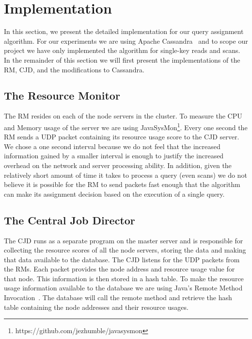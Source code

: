 \section{Implementation}
\label{sec:implementation}
In this section, we present the detailed implementation for our query assignment algorithm. For our experiments we are using Apache Cassandra~\cite{ Lakshman:2010:CDS:1773912.1773922} and to scope our project we have only implemented the algorithm for single-key reads and scans. In the remainder of this section we will first present the implementations of the RM, CJD, and the modifications to Cassandra.

\subsection{The Resource Monitor}
The RM resides on each of the node servers in the cluster. To measure the CPU and Memory usage of the server we are using JavaSysMon\footnote{https://github.com/jezhumble/javasysmon}. Every one second the RM sends a UDP packet containing its resource usage score to the CJD server. We chose a one second interval because we do not feel that the increased information gained by a smaller interval is enough to justify the increased overhead on the network and server processing ability. In addition, given the relatively short amount of time it takes to process a query (even scans) we do not believe it is possible for the RM to send packets fast enough that the algorithm can make its assignment decision based on the execution of a single query.

\subsection{The Central Job Director}
The CJD runs as a separate program on the master server and is responsible for collecting the resource scores of all the node servers, storing the data and making that data available to the database. The CJD listens for the UDP packets from the RMs. Each packet provides the node address and resource usage value for that node. This information is then stored in a hash table. To make the resource usage information available to the database we are using Java's Remote Method Invocation~\cite{JavaRMI}. The database will call the remote method and retrieve the hash table containing the node addresses and their resource usages.

